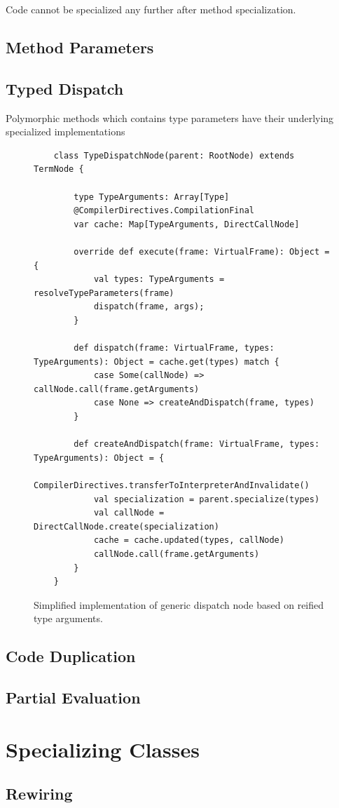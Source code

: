Code cannot be specialized any further after method specialization.

\subsection{Method Parameters}

\subsection{Typed Dispatch}


Polymorphic methods which contains type parameters have their underlying specialized implementations 


\begin{figure}[H]
	\begin{verbatim}
	class TypeDispatchNode(parent: RootNode) extends TermNode {
		
		type TypeArguments: Array[Type]
		@CompilerDirectives.CompilationFinal
		var cache: Map[TypeArguments, DirectCallNode]
		
		override def execute(frame: VirtualFrame): Object = {
			val types: TypeArguments = resolveTypeParameters(frame)
			dispatch(frame, args);
		}
		
		def dispatch(frame: VirtualFrame, types: TypeArguments): Object = cache.get(types) match {
			case Some(callNode) => callNode.call(frame.getArguments)
			case None => createAndDispatch(frame, types)
		}
		
		def createAndDispatch(frame: VirtualFrame, types: TypeArguments): Object = {
			CompilerDirectives.transferToInterpreterAndInvalidate()
			val specialization = parent.specialize(types)
			val callNode = DirectCallNode.create(specialization)
			cache = cache.updated(types, callNode)
			callNode.call(frame.getArguments)
		}
	}
	\end{verbatim}
\caption{Simplified implementation of generic dispatch node based on reified type arguments.}
\end{figure}

\subsection{Code Duplication}


\subsection{Partial Evaluation}

\section{Specializing Classes}

\subsection{Rewiring}
